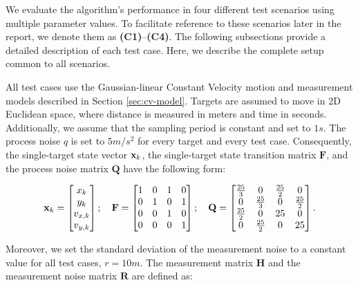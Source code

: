 We evaluate the algorithm's performance in four different test scenarios using multiple parameter values. To facilitate reference to these scenarios later in the report, we denote them as \textbf{(C1)}--\textbf{(C4)}. The following subsections provide a detailed description of each test case. Here, we describe the complete setup common to all scenarios.

All test cases use the Gaussian-linear Constant Velocity motion and measurement models described in Section \ref{sec:cv-model}. Targets are assumed to move in 2D Euclidean space, where distance is measured in meters and time in seconds. Additionally, we assume that the sampling period is constant and set to $1 s$. The process noise $q$ is set to $5 m/s^2$ for every target and every test case. Consequently, the single-target state vector $\vecat{x}{k}$, the single-target state transition matrix $\mathbf{F}$, and the process noise matrix $\mathbf{Q}$ have the following form:

\begin{equation}
    \vecat{x}{k} =
    \begin{bmatrix}
        x_{k} \\ 
        y_{k} \\ 
        v_{x,k} \\ 
        v_{y,k}
    \end{bmatrix};
    \quad
    \mathbf{F} =
    \begin{bmatrix}
       1 & 0 & 1 & 0 \\
       0 & 1 & 0 & 1 \\
       0 & 0 & 1 & 0 \\
       0 & 0 & 0 & 1 
    \end{bmatrix};
    \quad
    \mathbf{Q} = \begin{bmatrix}
        \frac{25}{3}    & 0             & \frac{25}{2}      & 0  \\
        0               & \frac{25}{3}  & 0                 & \frac{25}{2} \\
        \frac{25}{2}    & 0             & 25                & 0 \\
        0               & \frac{25}{2}  & 0                 & 25
    \end{bmatrix}.
\end{equation}

Moreover, we set the standard deviation of the measurement noise to a constant value for all test cases, $r = 10 m$. The measurement matrix $\mathbf{H}$ and the measurement noise matrix $\mathbf{R}$ are defined as:

